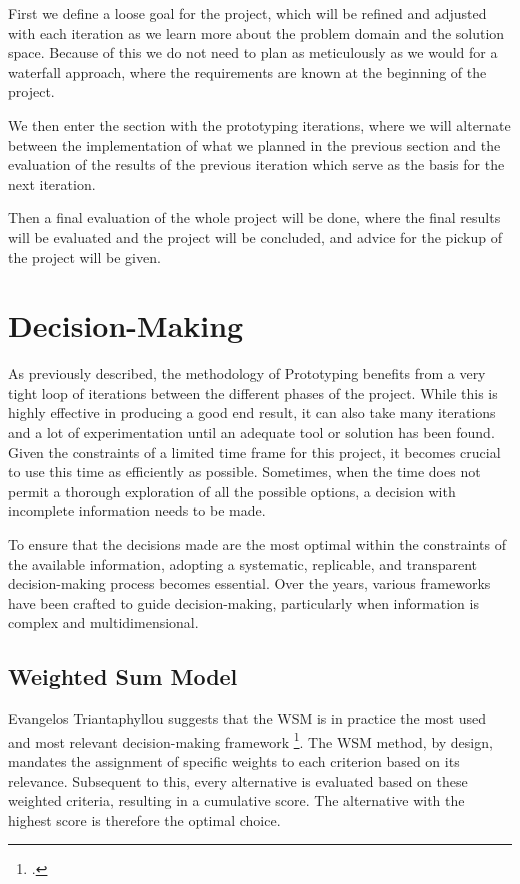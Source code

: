 First we define a loose goal for the project, which will be refined and adjusted with each iteration as we learn more about the problem domain and the solution space.
Because of this we do not need to plan as meticulously as we would for a waterfall approach, where the requirements are known at the beginning of the project.


We then enter the section with the prototyping iterations, 
where we will alternate between the implementation of what we planned in the previous section and
the evaluation of the results of the previous iteration which serve as the basis for the next iteration.
 
Then a final evaluation of the whole project will be done, where the final results will be evaluated and the project will be concluded,
and advice for the pickup of the project will be given.

\section{Decision-Making}
\label{decision_making}

As previously described, the methodology of Prototyping benefits from a very tight loop of iterations between the different phases of the project.
While this is highly effective in producing a good end result, it can also take many iterations and a lot of experimentation until an adequate tool or solution has been found.
Given the constraints of a limited time frame for this project, it becomes crucial to use this time as efficiently as possible.
Sometimes, when the time does not permit a thorough exploration of all the possible options, a decision with incomplete information needs to be made.
 
To ensure that the decisions made are the most optimal within the constraints of the available information, adopting a systematic, replicable, and transparent decision-making process becomes essential. Over the years, various frameworks have been crafted to guide decision-making, 
particularly when information is complex and multidimensional.

\subsection{Weighted Sum Model}
Evangelos Triantaphyllou suggests that the \ac{WSM} is in practice the most used and most relevant decision-making framework \footcite[p. 1]{triantaphyllouIntroductionMultiCriteriaDecision2000}.
The \ac{WSM} method, by design, mandates the assignment of specific weights to each criterion based on its relevance. Subsequent to this, every alternative is evaluated based on these weighted criteria, resulting in a cumulative score.
The alternative with the highest score is therefore the optimal choice.



